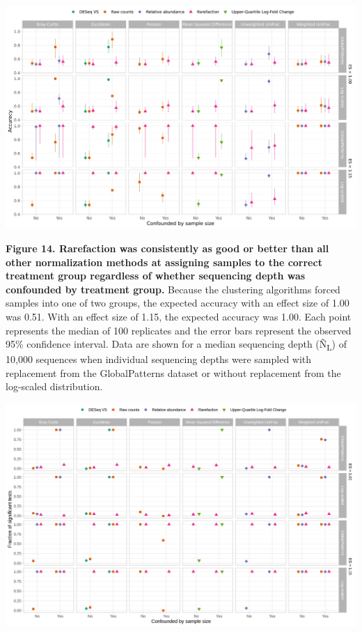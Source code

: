 \documentclass[
]{article}
\begin{document}
\newpage

\includegraphics{figure_14.png}

\textbf{Figure 14. Rarefaction was consistently as good or better than
all other normalization methods at assigning samples to the correct
treatment group regardless of whether sequencing depth was confounded by
treatment group.} Because the clustering algorithms forced samples into
one of two groups, the expected accuracy with an effect size of 1.00 was
0.51. With an effect size of 1.15, the expected accuracy was 1.00. Each
point represents the median of 100 replicates and the error bars
represent the observed 95\% confidence interval. Data are shown for a
median sequencing depth (Ñ\textsubscript{L}) of 10,000 sequences when
individual sequencing depths were sampled with replacement from the
GlobalPatterns dataset or without replacement from the log-scaled
distribution.

\newpage

\includegraphics{figure_15.png}
\end{document}
